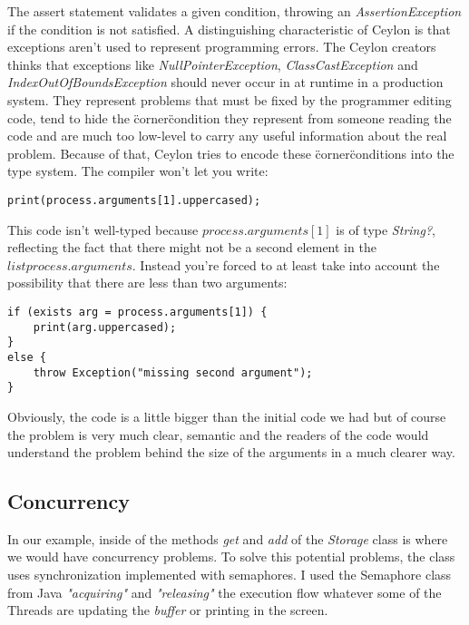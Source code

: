 \documentclass{abnt}
\begin{document}
The assert statement validates a given condition, throwing an
\textit{AssertionException} if the condition is not satisfied. A distinguishing
characteristic of Ceylon is that exceptions aren't used to represent programming
errors. The Ceylon creators thinks that exceptions like \textit{NullPointerException},
\textit{ClassCastException} and \textit{IndexOutOfBoundsException} should never occur in at
runtime in a production system. They represent problems that must be fixed by
the programmer editing code, tend to hide the \"corner\" condition they represent
from someone reading the code and are much too low-level to carry any useful
information about the real problem. Because of that, Ceylon tries to encode
these \"corner\" conditions into the type system.
The compiler won't let you write:

\begin{lstlisting}[label=cpc,caption=Ceylon Producer-Consumer example]
print(process.arguments[1].uppercased);
\end{lstlisting}

This code isn't well-typed because $process.arguments[1]$ is of type
\textit{String?}, reflecting the fact that there might not be a second element in the
$list process.arguments$. Instead you're forced to at least take into
account the possibility that there are less than two arguments:

\begin{lstlisting}[label=cpc,caption=Ceylon Producer-Consumer example]
if (exists arg = process.arguments[1]) {
    print(arg.uppercased);
}
else {
    throw Exception("missing second argument");
}
\end{lstlisting}

Obviously, the code is a little bigger than the initial code we had but of
course the problem is very much clear, semantic and the readers of the code
would understand the problem behind the size of the arguments in a much clearer
way.

\subsection{Concurrency}

In our example, inside of the methods \textit{get} and \textit{add} of the \textit{Storage} class is
where we would have concurrency problems\cite{2_1}. To solve this potential
problems, the class uses synchronization implemented with semaphores. I used the
Semaphore class from Java \textit{"acquiring"} and \textit{"releasing"} the
execution flow whatever some of the Threads are updating the \textit{buffer} or
printing in the screen.
\end{document}
